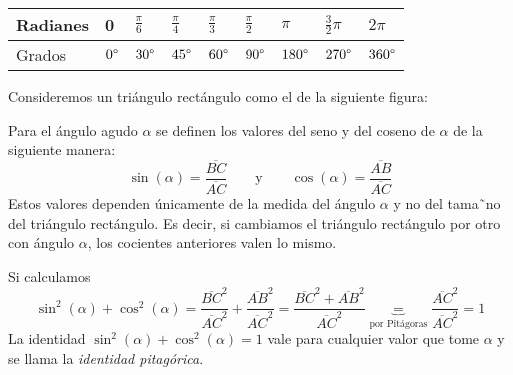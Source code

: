 \documentclass[../teoria.root.tex]{subfiles}
\begin{document}
\begin{center}
    \begin{tabularx}{\textwidth}{|m{2cm}|X|X|X|X|X|X|X|X|}
        \hline
        Radianes & 0            & \(\frac{\pi}{6}\) & \(\frac{\pi}{4}\) & \(\frac{\pi}{3}\) & \(\frac{\pi}{2}\) & \(\pi\)        & \(\frac{3}{2}\pi\) & \(2\pi\)       \\\hline
        Grados   & \(0\degree\) & \(30\degree\)     & \(45\degree\)     & \(60\degree\)     & \(90\degree\)     & \(180\degree\) & \(270\degree\)     & \(360\degree\) \\\hline
    \end{tabularx}
\end{center}
Consideremos un triángulo rectángulo como el de la siguiente figura:
\begin{center}
\end{center}
Para el ángulo agudo \(\alpha\) se definen los valores del seno y del coseno de \(\alpha\) de la siguiente manera:
\[\sin(\alpha)=\frac{\overline{BC}}{\overline{AC}}\qquad\text{y}\qquad\cos(\alpha)=\frac{\overline{AB}}{\overline{AC}}\]
Estos valores dependen únicamente de la medida del ángulo \(\alpha\) y no del tama˜no del triángulo rectángulo.
Es decir, si cambiamos el triángulo rectángulo por otro con ángulo \(\alpha\), los cocientes anteriores valen lo mismo.

Si calculamos \[\sin^2(\alpha)+\cos^2(\alpha)=\frac{\overline{BC}^2}{\overline{AC}^2}+\frac{\overline{AB}^2}{\overline{AC}^2}=\frac{\overline{BC}^2+\overline{AB}^2}{\overline{AC}^2}\underbrace{=}_{\text{por Pitágoras}}\frac{\overline{AC}^2}{\overline{AC}^2}=1\]
La identidad \(\sin^2(\alpha) + \cos^2(\alpha) = 1\) vale para cualquier valor que tome \(\alpha\) y se llama la \textit{identidad pitagórica}.
\end{document}
